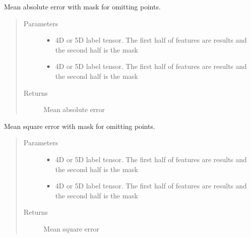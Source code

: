 \documentclass[letterpaper,10pt,english]{sphinxmanual}
\begin{document}
\begin{fulllineitems}
\label{\detokenize{index:boundary.loss.masked_mean_absolute_error}}
Mean absolute error with mask for omitting points.
\begin{quote}\begin{description}
\item[{Parameters}] \leavevmode\begin{itemize}
\item {} 
 \textendash{} 4D or 5D label tensor.  The first half of features are results and the second half is the mask

\item {} 
 \textendash{} 4D or 5D label tensor.  The first half of features are results and the second half is the mask

\end{itemize}

\item[{Returns}] \leavevmode
Mean absolute error

\end{description}\end{quote}

\end{fulllineitems}


\begin{fulllineitems}
\label{\detokenize{index:boundary.loss.masked_mean_square_error}}
Mean square error with mask for omitting points.
\begin{quote}\begin{description}
\item[{Parameters}] \leavevmode\begin{itemize}
\item {} 
 \textendash{} 4D or 5D label tensor.  The first half of features are results and the second half is the mask

\item {} 
 \textendash{} 4D or 5D label tensor.  The first half of features are results and the second half is the mask

\end{itemize}

\item[{Returns}] \leavevmode
Mean square error

\end{description}\end{quote}

\end{fulllineitems}
\end{document}
